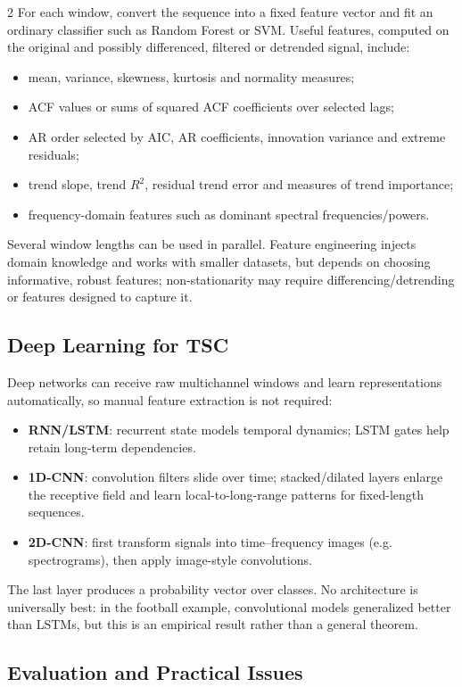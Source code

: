 \documentclass[9pt,a4paper]{extarticle}
\newcommand{\key}[1]{\textbf{#1}}
\begin{document}
\begin{multicols}{2}
For each window, convert the sequence into a fixed feature vector and fit an ordinary classifier such as Random Forest or SVM. Useful features, computed on the original and possibly differenced, filtered or detrended signal, include:
\begin{itemize}
\item mean, variance, skewness, kurtosis and normality measures;
\item ACF values or sums of squared ACF coefficients over selected lags;
\item AR order selected by AIC, AR coefficients, innovation variance and extreme residuals;
\item trend slope, trend \(R^2\), residual trend error and measures of trend importance;
\item frequency-domain features such as dominant spectral frequencies/powers.
\end{itemize}
Several window lengths can be used in parallel. Feature engineering injects domain knowledge and works with smaller datasets, but depends on choosing informative, robust features; non-stationarity may require differencing/detrending or features designed to capture it.

\subsection{Deep Learning for TSC}

Deep networks can receive raw multichannel windows and learn representations automatically, so manual feature extraction is not required:
\begin{itemize}
\item \key{RNN/LSTM}: recurrent state models temporal dynamics; LSTM gates help retain long-term dependencies.
\item \key{1D-CNN}: convolution filters slide over time; stacked/dilated layers enlarge the receptive field and learn local-to-long-range patterns for fixed-length sequences.
\item \key{2D-CNN}: first transform signals into time--frequency images (e.g. spectrograms), then apply image-style convolutions.
\end{itemize}
The last layer produces a probability vector over classes. No architecture is universally best: in the football example, convolutional models generalized better than LSTMs, but this is an empirical result rather than a general theorem.

\subsection{Evaluation and Practical Issues}


\end{multicols}
\end{document}
